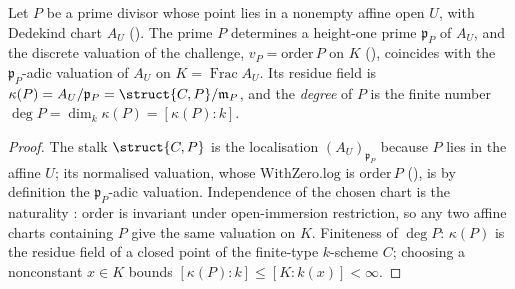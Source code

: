 \begin{definition}
  \label{def:adelic_pointValuation}
  Let \(P\) be a prime divisor whose point lies in a nonempty affine open
  \(U\), with Dedekind chart \(A_U\)
  (). The prime \(P\)
  determines a height-one prime \(\mathfrak p_P\) of \(A_U\), and the
  discrete valuation of the challenge,
  \(v_P = \mathrm{order}\, P\) on \(K\) (),
  coincides with the \(\mathfrak p_P\)-adic valuation of \(A_U\) on
  \(K = \operatorname{Frac} A_U\). Its residue field is
  \(\kappa(P) = A_U/\mathfrak p_P = \struct{C, P}/\mathfrak m_P\), and the
  \emph{degree} of \(P\) is the finite number
  \(\deg P = \dim_k \kappa(P) = [\kappa(P) : k]\).
\end{definition}
\begin{proof}
  The stalk \(\struct{C, P}\) is the localisation \((A_U)_{\mathfrak p_P}\)
  because \(P\) lies in the affine \(U\); its normalised valuation, whose
  \(\mathrm{WithZero.log}\) is \(\mathrm{order}\, P\)
  (), is by definition the
  \(\mathfrak p_P\)-adic valuation. Independence of the chosen chart is
  the naturality : \(\mathrm{order}\)
  is invariant under open-immersion restriction, so any two affine charts
  containing \(P\) give the same valuation on \(K\). Finiteness of
  \(\deg P\): \(\kappa(P)\) is the residue field of a closed point of the
  finite-type \(k\)-scheme \(C\); choosing a nonconstant \(x \in K\)
  bounds \([\kappa(P) : k] \le [K : k(x)] < \infty\).
\end{proof}

